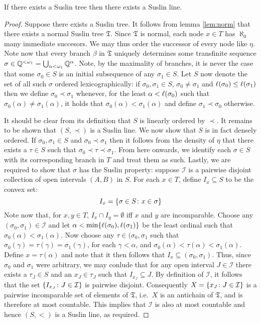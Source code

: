 \begin{lem}\label{lem:tline}
	If there exists a Suslin tree then there exists a Suslin line.
\end{lem}
\begin{proof}
	Suppose there exists a Suslin tree.  It follows from lemma \ref{lem:norm} that there exists a normal Suslin tree $\mathfrak{T}$.  Since $\mathfrak{T}$ is normal, each node $x\in T$ has $\aleph_0$ many immediate succesors.  We may thus order the successor of every node like $\eta$.  Note now that every branch $\beta$ in $\mathfrak{T}$ uniquely determines some transfinite sequence $\sigma\in\mathbb{Q}^{<\omega_1}=\bigcup_{\alpha<\omega_1}\mathbb{Q}^\alpha$.  Note, by the maximality of branches, it is never the case that some $\sigma_0\in S$ is an initial subsequence of any $\sigma_1\in S$.  Let $S$ now denote the set of all such $\sigma$ ordered lexicographically: if $\sigma_0,\sigma_1\in S$, $\sigma_0\neq\sigma_1$ and $\ell(\sigma_0)\leq\ell(\sigma_1)$ then we define $\sigma_0\prec\sigma_1$ whenever, for the least $\alpha<\ell(\sigma_0)$ such that $\sigma_0(\alpha)\neq\sigma_1(\alpha)$, it holds that $\sigma_0(\alpha)<\sigma_1(\alpha)$ and define $\sigma_1\prec\sigma_0$ otherwise.

	It should be clear from its definition that $S$ is linearly ordered by $\prec$.  It remains to be shown that $(S,\prec)$ is a Suslin line.  We now show that $S$ is in fact densely ordered.  If $\sigma_0,\sigma_1\in S$ and $\sigma_0\prec\sigma_1$ then it follows from the density of $\eta$ that there exists a $\tau\in S$ such that $\sigma_0\prec\tau\prec\sigma_1$.  From here onwards, we identify each $\sigma\in S$ with its corresponding branch in $T$ and treat them as such.  Lastly, we are required to show that $\sigma$ has the Suslin property:  suppose $\mathcal{I}$ is a pairwise disjoint collection of open intervals $(A,B)$ in $S$.  For each $x\in T$, define $I_x\subseteq S$ to be the convex set:
	\begin{equation}
		I_x=\lbrace \sigma\in S\colon x\in \sigma \rbrace
	\end{equation}
	Note now that, for $x,y\in T$, $I_x\cap I_y=\emptyset$ iff $x$ and $y$ are incomparable.  Choose any $(\sigma_0,\sigma_1)\in\mathcal{I}$ and let $\alpha<\min\lbrace \ell(\sigma_0),\ell(\sigma_1)\rbrace$ be the least ordinal such that $\sigma_0(\alpha)<\sigma_1(\alpha)$.  Now choose any $\tau\in(\sigma_0,\sigma_1$ such that $\sigma_0(\gamma)=\tau(\gamma)=\sigma_1(\gamma)$, for each $\gamma<\alpha$, and $\sigma_0(\alpha)<\tau(\alpha)<\sigma_1(\alpha)$.  Define $x=\tau(\alpha)$ and note that it then follows that $I_x\subseteq(\sigma_0,\sigma_1)$.  Thus, since $\sigma_0$ and $\sigma_1$ were arbitrary, we may conlude that for any open interval $J\in\mathcal{I}$ there exists a $\tau_J\in S$ and an $x_J\in\tau_J$ such that $I_{x_J}\subseteq J$.  By definition of $\mathcal{I}$, it follows that the set $\lbrace I_{x_J}\colon J\in\mathcal{I} \rbrace$ is pairwise disjoint.  Consequently $X=\lbrace x_J\colon J\in\mathcal{I} \rbrace$ is a pairwise incomparable set of elements of $\mathfrak{T}$, i.e.\ $X$ is an antichain of $\mathfrak{T}$, and is therefore at most countable.  This implies that $\mathcal{I}$ is also at most countable and hence $(S,<)$ is a Suslin line, as required.
\end{proof}

